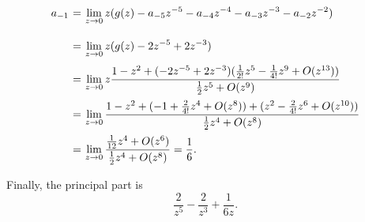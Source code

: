 \[ \everymath{\displaystyle}
\arraycolsep=1.8pt\def\arraystretch{2.5}
\begin{array}{rcl}
    a_{-1} & = & \lim_{z\to 0} z (g(z) - a_{-5} z^{-5} - a_{-4} z^{-4} - a_{-3} z^{-3} - a_{-2} z^{-2}) \\
    & = & \lim_{z\to 0} z (g(z) - 2z^{-5} + 2z^{-3})\\
    & = & \lim_{z\to 0} z \frac{1-z^2 + (- 2z^{-5} + 2z^{-3})(\frac{1}{2!} z^5 - \frac{1}{4!} z^9 + O(z^{13}))}{\frac{1}{2} z^5 + O(z^9)}\\
    & = & \lim_{z\to 0} \frac{1 - z^2 + (-1 + \frac{2}{4!} z^{4} + O(z^8)) + (z^2 - \frac{2}{4!} z^{6} + O(z^{10}))}{\frac{1}{2} z^4 + O(z^8)}\\
    & = & \lim_{z\to 0} \frac{\frac{1}{12} z^{4} + O(z^6) }{\frac{1}{2}z^4 + O(z^8)} = \frac{1}{6}.
\end{array} \]

Finally, the principal part is
\[ \frac{2}{z^5} - \frac{2}{z^3} + \frac{1}{6z}. \]